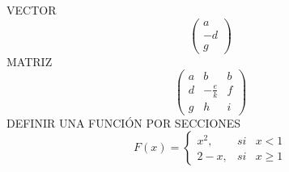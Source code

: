 \documentclass{article}
\begin{document}
VECTOR
$$
\left(
\begin{array}{r}			
a\\
-d\\
g
\end{array}
\right)
$$
MATRIZ
$$
\left(
\begin{array}{crc}			
a&b&b\\[1mm]
d&-\frac{e}{k}&f\\[1mm]
g&h&i
\end{array}
\right)
$$
DEFINIR UNA FUNCIÓN POR SECCIONES
$$ F(x)=
\left\lbrace
\begin{array}{rcc}			
x^2, &si &x<1\\
2-x, &si &x\geq1
\end{array}
\right.
$$
\end{document}
